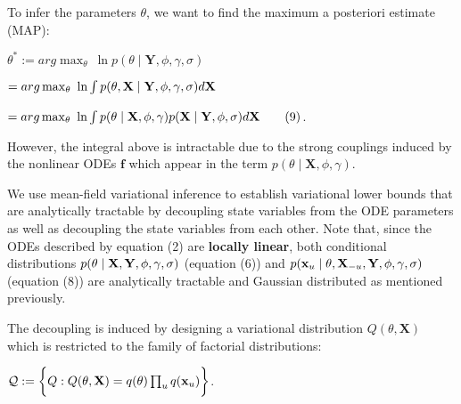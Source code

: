 \begin{par}
To infer the parameters $\theta$, we want to find the maximum a posteriori estimate (MAP):
\end{par} \vspace{1em}
\begin{par}
$\theta^* := arg \max_{\theta} ~ \ln p(\theta \mid \mathbf{Y},\phi,\gamma, \sigma)$
\end{par} \vspace{1em}
\begin{par}
$= arg\max_{\theta} ~ \ln \int  p(\theta,\mathbf{X} \mid \mathbf{Y},\phi,\gamma,\boldmath\sigma) d\mathbf{X}$
\end{par} \vspace{1em}
\begin{par}
$= arg\max_{\theta} ~ \ln \int p(\theta \mid \mathbf{X},\phi,\gamma) p(\mathbf{X} \mid \mathbf{Y}, \phi,\boldmath\sigma) d\mathbf{X} \qquad (9)$.
\end{par} \vspace{1em}
\begin{par}
However, the integral above is intractable due to the strong couplings induced by the nonlinear ODEs $\mathbf{f}$ which appear in the term $p(\theta \mid \mathbf{X},\phi,\gamma)$.
\end{par} \vspace{1em}
\begin{par}
We use mean-field variational inference to establish variational lower bounds that are analytically tractable by decoupling state variables from the ODE parameters as well as decoupling the state variables from each other. Note that, since the ODEs described by equation (2) are \textbf{locally linear}, both conditional distributions $p(\theta \mid \mathbf{X},\mathbf{Y},\phi,\gamma,\boldmath\sigma)$ (equation (6)) and $p(\mathbf{x}_u \mid \theta, \mathbf{X}_{-u},\mathbf{Y},\phi,\gamma,\boldmath\sigma)$ (equation (8)) are analytically tractable and Gaussian distributed as mentioned previously.
\end{par} \vspace{1em}
\begin{par}
The decoupling is induced by designing a variational distribution $Q(\theta,\mathbf{X})$ which is restricted to the family of factorial distributions:
\end{par} \vspace{1em}
\begin{par}
$\mathcal{Q} := \bigg{\{} Q : Q(\theta,\mathbf{X}) = q(\theta) \prod_u q(\mathbf{x}_u) \bigg{\}}$.
\end{par} \vspace{1em}
